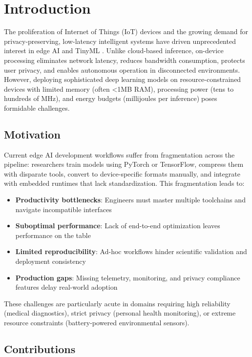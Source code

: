 \section{Introduction}

The proliferation of Internet of Things (IoT) devices and the growing demand for privacy-preserving, low-latency intelligent systems have driven unprecedented interest in edge AI and TinyML \cite{warden2019tinyml}. Unlike cloud-based inference, on-device processing eliminates network latency, reduces bandwidth consumption, protects user privacy, and enables autonomous operation in disconnected environments. However, deploying sophisticated deep learning models on resource-constrained deviceswith limited memory (often <1MB RAM), processing power (tens to hundreds of MHz), and energy budgets (millijoules per inference)poses formidable challenges.

\subsection{Motivation}

Current edge AI development workflows suffer from fragmentation across the pipeline: researchers train models using PyTorch or TensorFlow, compress them with disparate tools, convert to device-specific formats manually, and integrate with embedded runtimes that lack standardization. This fragmentation leads to:

\begin{itemize}
\item \textbf{Productivity bottlenecks}: Engineers must master multiple toolchains and navigate incompatible interfaces
\item \textbf{Suboptimal performance}: Lack of end-to-end optimization leaves performance on the table
\item \textbf{Limited reproducibility}: Ad-hoc workflows hinder scientific validation and deployment consistency
\item \textbf{Production gaps}: Missing telemetry, monitoring, and privacy compliance features delay real-world adoption
\end{itemize}

These challenges are particularly acute in domains requiring high reliability (medical diagnostics), strict privacy (personal health monitoring), or extreme resource constraints (battery-powered environmental sensors).

\subsection{Contributions}

